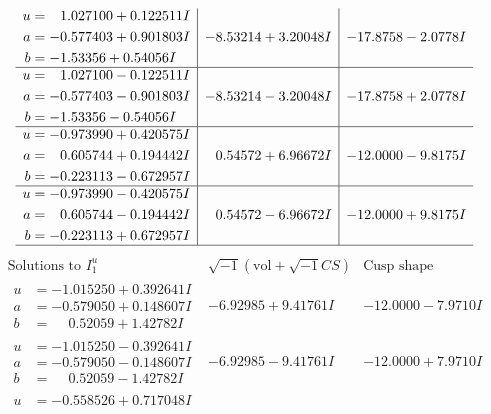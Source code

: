 \documentclass[1p]{elsarticle_modified}
\theoremstyle{definition}
\newcommand{\I}{\sqrt{-1}}
\begin{document}
$$\begin{array}{c|c|c}
\begin{aligned}
u &= \phantom{-}1.027100 + 0.122511 I \\
a &= -0.577403 + 0.901803 I \\
b &= -1.53356 + 0.54056 I\end{aligned}
 & -8.53214 + 3.20048 I & -17.8758 - 2.0778 I \\ \hline\begin{aligned}
u &= \phantom{-}1.027100 - 0.122511 I \\
a &= -0.577403 - 0.901803 I \\
b &= -1.53356 - 0.54056 I\end{aligned}
 & -8.53214 - 3.20048 I & -17.8758 + 2.0778 I \\ \hline\begin{aligned}
u &= -0.973990 + 0.420575 I \\
a &= \phantom{-}0.605744 + 0.194442 I \\
b &= -0.223113 - 0.672957 I\end{aligned}
 & \phantom{-}0.54572 + 6.96672 I & -12.0000 - 9.8175 I \\ \hline\begin{aligned}
u &= -0.973990 - 0.420575 I \\
a &= \phantom{-}0.605744 - 0.194442 I \\
b &= -0.223113 + 0.672957 I\end{aligned}
 & \phantom{-}0.54572 - 6.96672 I & -12.0000 + 9.8175 I\\
 \hline 
 \end{array}$$\newpage$$\begin{array}{c|c|c}  
\text{Solutions to }I^u_{1}& \I (\text{vol} + \sqrt{-1}CS) & \text{Cusp shape}\\
 \hline 
\begin{aligned}
u &= -1.015250 + 0.392641 I \\
a &= -0.579050 + 0.148607 I \\
b &= \phantom{-}0.52059 + 1.42782 I\end{aligned}
 & -6.92985 + 9.41761 I & -12.0000 - 7.9710 I \\ \hline\begin{aligned}
u &= -1.015250 - 0.392641 I \\
a &= -0.579050 - 0.148607 I \\
b &= \phantom{-}0.52059 - 1.42782 I\end{aligned}
 & -6.92985 - 9.41761 I & -12.0000 + 7.9710 I \\ \hline\begin{aligned}
u &= -0.558526 + 0.717048 I \\

\end{aligned}
\end{array}$$
\end{document}
